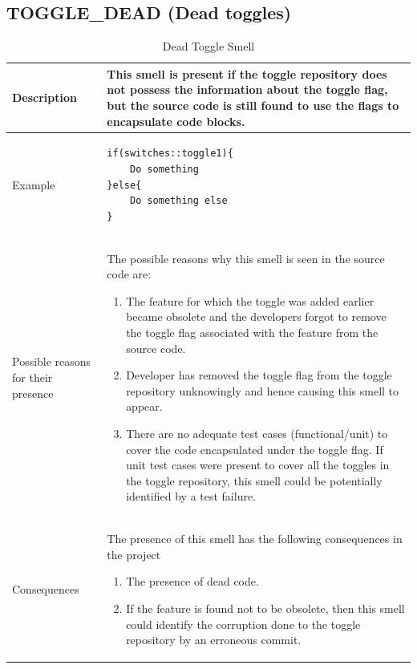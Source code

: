\documentclass[conference]{IEEEtran}
\begin{document}
\subsection{TOGGLE\_DEAD (Dead toggles)}

\begin{table}[!h]
\caption{Dead Toggle Smell}
\centering
\begin{tabular}{|p{1.5cm}|p{7cm}|}
 \hline\hline
 Description & This smell is present if the toggle repository does not possess the information about the toggle flag, but the source code is still found to use the flags to encapsulate code blocks. \\ \hline
 Example & 
 \begin{lstlisting}
if(switches::toggle1){
    Do something
}else{
    Do something else
}
 \end{lstlisting}
  \\ \hline

 Possible reasons for their presence & The possible reasons why this smell is seen in the source code are:
 \begin{enumerate}
 \item{The feature for which the toggle was added earlier became obsolete and the developers forgot to remove the toggle flag associated with the feature from the source code.}
 \item{Developer has removed the toggle flag from the toggle repository unknowingly and hence causing this smell to appear.}
 \item{There are no adequate test cases (functional/unit) to cover the code encapsulated under the toggle flag. If unit test cases were present to cover all the toggles in the toggle repository, this smell could be potentially identified by a test failure.}
 \end{enumerate}
 \\ \hline
 
 Consequences & The presence of this smell has the following consequences in the project
 \begin{enumerate}
 \item{The presence of dead code.}
 \item{If the feature is found not to be obsolete, then this smell could identify the corruption done to the toggle repository by an erroneous commit.}
 \end{enumerate}
 \\ \hline
 

\end{tabular}
\end{table}
\end{document}
